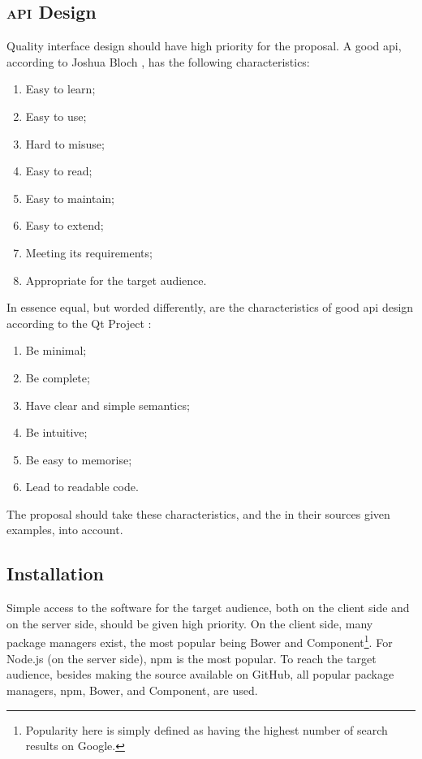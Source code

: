 \subsection{\textsc{api} Design}\label{design-1}

Quality interface design should have high priority for the proposal.
A good \gls{api}, according to Joshua Bloch
  \autocite*{bloch-joshua-how-design-good-api-why-matters}, has the following
  characteristics:

\begin{enumerate}
\item Easy to learn;
\item Easy to use;
\item Hard to misuse;
\item Easy to read;
\item Easy to maintain;
\item Easy to extend;
\item Meeting its requirements;
\item Appropriate for the target audience.
\end{enumerate}

\noindent In essence equal, but worded differently, are the characteristics
  of good \gls{api} design according to the Qt Project
  \autocite*{qt-project.org-api-design-principles}:

\begin{enumerate}
\item Be minimal;
\item Be complete;
\item Have clear and simple semantics;
\item Be intuitive;
\item Be easy to memorise;
\item Lead to readable code.
\end{enumerate}

\noindent The proposal should take these characteristics, and the in their
  sources given examples, into account.

\subsection{Installation}\label{installation}

Simple access to the software for the target audience, both on the client
  side and on the server side, should be given high priority.
On the client side, many package managers exist, the most
  popular being Bower and Component\footnote{Popularity here is simply
    defined as having the highest number of search results on Google.}.
For Node.js (on the server side), \gls{npm} is the most popular.
To reach the target audience, besides making the source available on GitHub,
  all popular package managers, \gls{npm}, Bower, and Component, are used.

